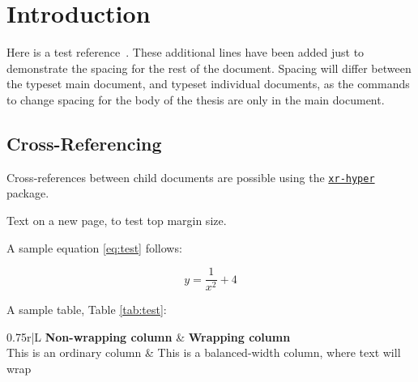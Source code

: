 \providecommand{\main}{..}



\chapter{Introduction}

Here is a test reference~\cite{Knuth68:art_of_programming}.
These additional lines have been added just to demonstrate the spacing
for the rest of the document. Spacing will differ between the typeset main
document, and typeset individual documents, as the commands
to change spacing for the body of the thesis are only in the main document.

\section{Cross-Referencing}\label{sec:crossRef}

Cross-references between child documents are possible using the
\href{https://ctan.org/pkg/xr-hyper}{\texttt{xr-hyper}} package.

\newpage

Text on a new page, to test top margin size.

A sample equation \eqref{eq:test} follows:

\begin{equation}
y = \frac{1}{x^2} + 4 \label{eq:test}
\end{equation}

A sample table, Table \ref{tab:test}:

\begin{table}[h]
    \centering
    \begin{tabulary}{0.75\textwidth}{r|L}
    \textbf{Non-wrapping column} & \textbf{Wrapping column} \\ \hline
    This is an ordinary column & This is a balanced-width column, where text will wrap
    \end{tabulary}
    \caption[A sample table] {A sample table created using the \href{https://ctan.org/pkg/tabulary}{\texttt{tabulary}} package}
    \label{tab:test}
\end{table}

